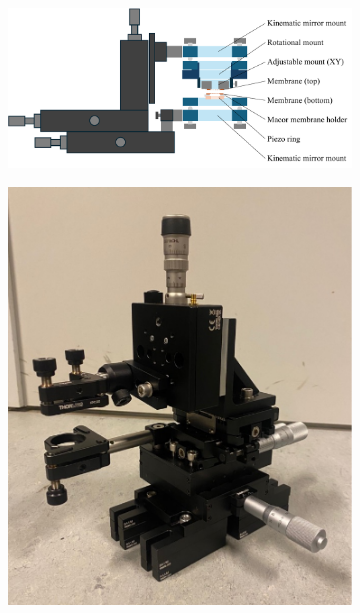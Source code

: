 \begin{figure}[h!]
    \centering
    \begin{subfigure}[b]{0.72\textwidth}
        \includegraphics[width=\textwidth]{figures/setup_skecth_zoomed.pdf}
        \caption{}
        \label{fig:setup_zoomed}
    \end{subfigure}
    \begin{subfigure}[b]{0.27\textwidth}
        \includegraphics[width=\textwidth]{figures/setup_cavity_picture.pdf}
        \caption{}
        \label{fig:cavity_setup_picture}

\end{subfigure}
\end{figure}
